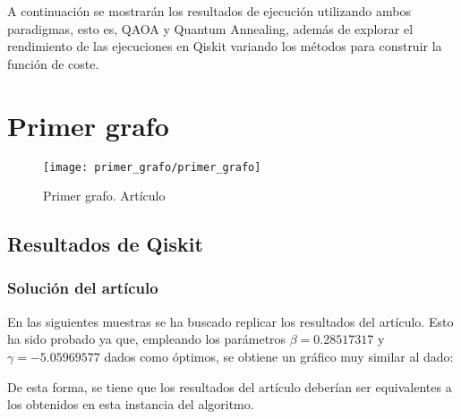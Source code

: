 \documentclass{article}
\begin{document}
A continuación se mostrarán los resultados de ejecución utilizando ambos paradigmas, esto es, QAOA y Quantum Annealing, además de explorar el rendimiento de las ejecuciones en Qiskit variando los métodos para construir la función de coste.

\section{Primer grafo}

\begin{figure}[htbp]
  \centering
  \texttt{[image: primer\_grafo/primer\_grafo]}
  \caption{Primer grafo. Artículo \cite{multi-objective_routing_optimization}}
\end{figure}

\subsection{Resultados de Qiskit}

\subsubsection{Solución del artículo}
\label{sec:5-primer-paper-resultados_qiskit}
En las siguientes muestras se ha buscado replicar los resultados del artículo. Esto ha sido probado ya que, empleando los parámetros \(\beta = 0.28517317\) y \(\gamma = -5.05969577 \) dados como óptimos, se obtiene un gráfico muy similar al dado: \\

\begin{figure}[htbp]
  \centering
  \caption{} \label{fig:5-primer_grafo/sin_restriccion_extra/primer_paper_aer_resultado}
\end{figure}

De esta forma, se tiene que los resultados del artículo deberían ser equivalentes a los obtenidos en esta instancia del algoritmo.
\end{document}
